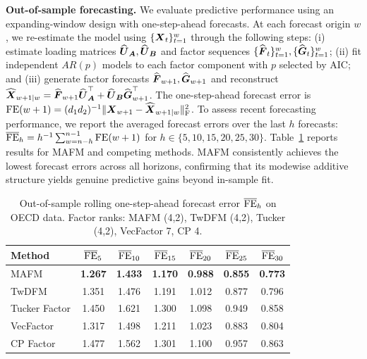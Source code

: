 \documentclass[11pt,letterpaper]{article}
\theoremstyle{definition}
\begin{document}
\noindent \textbf{Out-of-sample forecasting.}
We evaluate predictive performance using an expanding-window design with one-step-ahead forecasts. At each forecast origin $w$, we re-estimate the model using $\{\boldsymbol{X}_t\}_{t=1}^{w}$ through the following steps: (i) estimate loading matrices $\widehat{\boldsymbol{U}}_{\boldsymbol{A}}, \widehat{\boldsymbol{U}}_{\boldsymbol{B}}$ and factor sequences $\{\widehat{\boldsymbol{F}}_t\}_{t=1}^{w}, \{\widehat{\boldsymbol{G}}_t\}_{t=1}^{w}$; (ii) fit independent $AR(p)$ models to each factor component with $p$ selected by AIC; and (iii) generate factor forecasts $\widehat{\boldsymbol{F}}_{w+1}, \widehat{\boldsymbol{G}}_{w+1}$ and reconstruct $\widehat{\boldsymbol{X}}_{w+1|w} = \widehat{\boldsymbol{F}}_{w+1}\widehat{\boldsymbol{U}}_{\boldsymbol{A}}^{\top} + \widehat{\boldsymbol{U}}_{\boldsymbol{B}}\widehat{\boldsymbol{G}}_{w+1}^{\top}$. The one-step-ahead forecast error is ${\rm FE}(w+1) = (d_1d_2)^{-1} \|\boldsymbol{X}_{w+1}-\widehat {\boldsymbol{X}}_{w+1|w}\|_{\rm F}^2 $. To assess recent forecasting performance, we report the averaged forecast errors over the last $h$ forecasts: $\overline{{\rm FE}}_{h} = h^{-1}\sum_{w=n-h}^{n-1} {\rm FE}(w+1)$ for $h \in \{5, 10, 15, 20,25,30\}$. Table~\ref{tab:oecd_oos} reports results for MAFM and competing methods. MAFM consistently achieves the lowest forecast errors across all horizons, confirming that its modewise additive structure yields genuine predictive gains beyond in-sample fit.




\begin{table}[htbp!]
\centering
\setlength{\tabcolsep}{8pt}
\renewcommand{\arraystretch}{1.15}
\begin{tabular}{lcccccc}
\toprule
Method & $\overline{{\rm FE}}_5$ & $\overline{{\rm FE}}_{10}$ & $\overline{{\rm FE}}_{15}$ & $\overline{{\rm FE}}_{20}$ & $\overline{{\rm FE}}_{25}$ & $\overline{{\rm FE}}_{30}$ \\
\midrule
MAFM         & {\bf 1.267} & {\bf 1.433} & {\bf 1.170} & {\bf 0.988} & {\bf 0.855} & {\bf 0.773} \\
TwDFM        & 1.351 & 1.476 & 1.191 & 1.012 & 0.877 & 0.796 \\
Tucker Factor & 1.450 & 1.621 & 1.300 & 1.098 & 0.949 & 0.858 \\
VecFactor    & 1.317 & 1.498 & 1.211 & 1.023 & 0.883 & 0.804 \\
CP Factor    & 1.477 & 1.562 & 1.301 & 1.100 & 0.957 & 0.863 \\
\bottomrule
\end{tabular}
\caption{\small Out-of-sample rolling one-step-ahead forecast error $\overline{{\rm FE}}_h$ on OECD data. Factor ranks: MAFM (4,2), TwDFM (4,2), Tucker (4,2), VecFactor 7, CP 4.}
\label{tab:oecd_oos}
\end{table}
\end{document}
